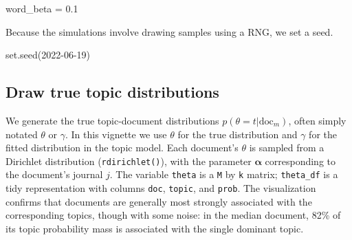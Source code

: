 \documentclass[
]{article}
\newenvironment{Shaded}{\begin{snugshade}}{\end{snugshade}}
\newcommand{\DecValTok}[1]{\textcolor[rgb]{0.68,0.00,0.00}{#1}}
\newcommand{\FloatTok}[1]{\textcolor[rgb]{0.68,0.00,0.00}{#1}}
\newcommand{\FunctionTok}[1]{\textcolor[rgb]{0.28,0.35,0.67}{#1}}
\newcommand{\NormalTok}[1]{\textcolor[rgb]{0.00,0.23,0.31}{#1}}
\newcommand{\OtherTok}[1]{\textcolor[rgb]{0.00,0.23,0.31}{#1}}
\begin{document}
\begin{Shaded}
\begin{Highlighting}[]
\NormalTok{word\_beta }\OtherTok{=} \FloatTok{0.1}
\end{Highlighting}
\end{Shaded}

Because the simulations involve drawing samples using a RNG, we set a
seed.

\begin{Shaded}
\begin{Highlighting}[]
\FunctionTok{set.seed}\NormalTok{(}\DecValTok{2022{-}06{-}19}\NormalTok{)}
\end{Highlighting}
\end{Shaded}

\hypertarget{draw-true-topic-distributions}{%
\subsection{Draw true topic
distributions}\label{draw-true-topic-distributions}}

We generate the true topic-document distributions
\(p(\theta = t | \mathrm{doc}_m)\), often simply notated \(\theta\) or
\(\gamma\). In this vignette we use \(\theta\) for the true distribution
and \(\gamma\) for the fitted distribution in the topic model. Each
document's \(\theta\) is sampled from a Dirichlet distribution
(\texttt{rdirichlet()}), with the parameter \(\mathbf{\alpha}\)
corresponding to the document's journal \(j\). The variable
\texttt{theta} is a \texttt{M} by \texttt{k} matrix; \texttt{theta\_df}
is a tidy representation with columns \texttt{doc}, \texttt{topic}, and
\texttt{prob}. The visualization confirms that documents are generally
most strongly associated with the corresponding topics, though with some
noise: in the median document, 82\% of its topic probability mass is
associated with the single dominant topic.
\end{document}
